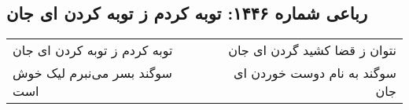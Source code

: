 \begin{center}
\section*{رباعی شماره ۱۴۴۶: توبه کردم ز توبه کردن ای جان}
\label{sec:1446}
\begin{longtable}{l p{0.5cm} r}
توبه کردم ز توبه کردن ای جان
&&
نتوان ز قضا کشید گردن ای جان
\\
سوگند بسر می‌نبرم لیک خوش است
&&
سوگند به نام دوست خوردن ای جان
\\
\end{longtable}
\end{center}
